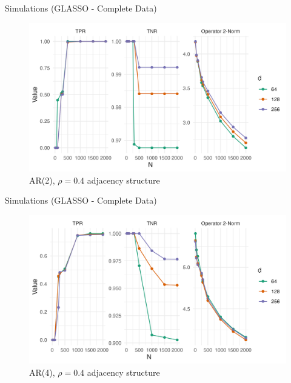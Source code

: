 \documentclass{beamer}
\begin{document}
\begin{frame}{Simulations (GLASSO - Complete Data)}
    \begin{figure}
        \centering 
        \includegraphics[scale=0.65]{glasso_complete_fixN_b2.png}
        \caption{AR(2), $\rho=0.4$ adjacency structure}
    \end{figure}
\end{frame}


\begin{frame}{Simulations (GLASSO - Complete Data)}
    \begin{figure}
        \centering 
        \includegraphics[scale=0.65]{glasso_complete_fixN_b4.png}
        \caption{AR(4), $\rho=0.4$ adjacency structure}
    \end{figure}
\end{frame}
\end{document}
